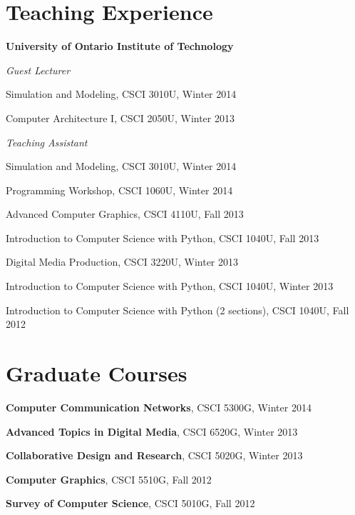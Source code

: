 \documentclass[letterpaper]{article}
\renewenvironment{itemize}{
  \begin{list}{}{
    \setlength{\leftmargin}{1.5em}
  }
}{
  \end{list}
}
\begin{document}
\section*{Teaching Experience}
\begin{itemize}
\item\textbf{University of Ontario Institute of Technology}
\item\textit{Guest Lecturer}
	\begin{itemize}
	\item Simulation and Modeling, CSCI 3010U, Winter 2014
 	\item Computer Architecture I, CSCI 2050U, Winter 2013
	\end{itemize}
\item\textit{Teaching Assistant}
	\begin{itemize}
	\item Simulation and Modeling, CSCI 3010U, Winter 2014
	\item Programming Workshop, CSCI 1060U, Winter 2014
	\item Advanced Computer Graphics, CSCI 4110U, Fall 2013
	\item Introduction to Computer Science with Python, CSCI 1040U, Fall 2013
	\item Digital Media Production, CSCI 3220U, Winter 2013
	\item Introduction to Computer Science with Python, CSCI 1040U, Winter 2013
	\item Introduction to Computer Science with Python (2 sections), CSCI 1040U, Fall 2012
	\end{itemize}
\end{itemize}


\section*{Graduate Courses}
\begin{itemize}
\item\textbf{Computer Communication Networks}, CSCI 5300G, Winter 2014
\item\textbf{Advanced Topics in Digital Media}, CSCI 6520G, Winter 2013
\item\textbf{Collaborative Design and Research}, CSCI 5020G, Winter 2013
\item\textbf{Computer Graphics}, CSCI 5510G, Fall 2012
\item\textbf{Survey of Computer Science}, CSCI 5010G, Fall 2012
\end{itemize}
\end{document}
